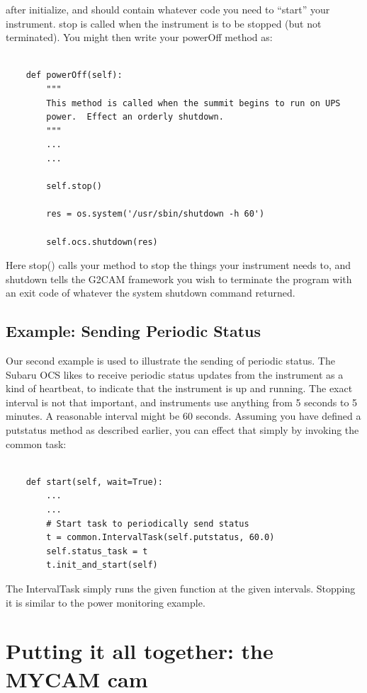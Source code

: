 \documentclass[11pt]{report}
\begin{document}
after initialize, and should contain whatever code you need to ``start''
your instrument. stop is called when the instrument is to be stopped
(but not terminated). You might then write your powerOff method as: 
\begin{verbatim}

    def powerOff(self):
        """
        This method is called when the summit begins to run on UPS
        power.  Effect an orderly shutdown.
        """
        ...
        ...
        
        self.stop()

        res = os.system('/usr/sbin/shutdown -h 60')

        self.ocs.shutdown(res)

\end{verbatim}
Here stop() calls your method to stop the things your instrument needs
to, and shutdown tells the G2CAM framework you wish to terminate the
program with an exit code of whatever the system shutdown command
returned. 

\subsection{Example: Sending Periodic Status}
Our second example is used to illustrate the sending of periodic
status. The Subaru OCS likes to receive periodic status updates from the
instrument as a kind of heartbeat, to indicate that the instrument is up
and running. The exact interval is not that important, and instruments
use anything from 5 seconds to 5 minutes. A reasonable interval might be
60 seconds. Assuming you have defined a putstatus method as described
earlier, you can effect that simply by invoking the common task: 
\begin{verbatim}

    def start(self, wait=True):
        ...
        ...
        # Start task to periodically send status
        t = common.IntervalTask(self.putstatus, 60.0)
        self.status_task = t
        t.init_and_start(self)

\end{verbatim}

The IntervalTask simply runs the given function at the given
intervals. Stopping it is similar to the power monitoring example. 

\section{Putting it all together: the MYCAM cam}
\end{document}
